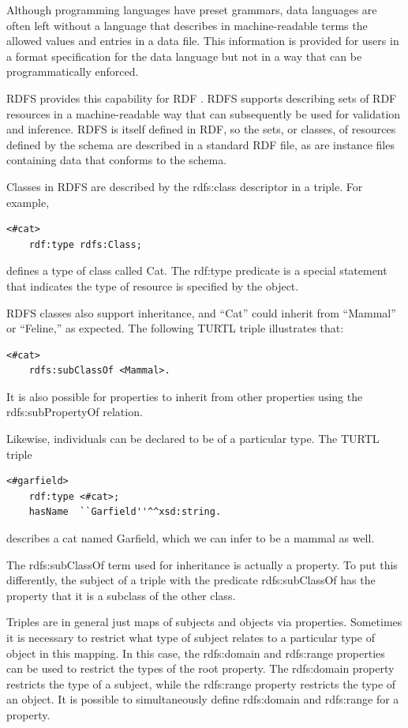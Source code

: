 Although programming languages have preset grammars, data languages are often
left without a language that describes in machine-readable terms the allowed
values and entries in a data file. This information is provided for users in
a format specification for the data language but not in a way that can be
programmatically enforced. 

RDFS provides this capability for RDF \cite{noauthor_rdf_nodate-5}\cite{
allemang_semantic_2008}. RDFS supports describing sets of RDF resources in a
machine-readable way that can subsequently be used for validation and inference.
RDFS is itself defined in RDF, so the sets, or classes, of resources defined by
the schema are described in a standard RDF file, as are instance files
containing data that conforms to the schema.

Classes in RDFS are described by the rdfs:class descriptor in a triple. For
example,
\begin{lstlisting}[language=TURTL]
<#cat>
    rdf:type rdfs:Class;
\end{lstlisting}
defines a type of class called Cat. The rdf:type predicate is a special
statement that indicates the type of resource is specified by the
object. 

RDFS classes also support inheritance, and ``Cat'' could inherit from
``Mammal'' or ``Feline,'' as expected. The following TURTL triple illustrates
that:
\begin{lstlisting}[language=TURTL]
<#cat>
    rdfs:subClassOf <Mammal>.
\end{lstlisting}
It is also possible for properties to inherit from other properties using the
rdfs:subPropertyOf relation.

Likewise, individuals can be declared to be of a particular type. The TURTL
triple
\begin{lstlisting}[language=TURTL]
<#garfield>
    rdf:type <#cat>;
    hasName  ``Garfield''^^xsd:string.
\end{lstlisting}
describes a cat named Garfield, which we can infer to be a mammal as well.

The rdfs:subClassOf term used for inheritance is actually a property. To put
this differently, the subject of a triple with the predicate rdfs:subClassOf
has the property that it is a subclass of the other class. 

Triples are in general just maps of subjects and objects via properties.
Sometimes it is necessary to restrict what type of subject relates to a
particular type of object in this mapping. In this case, the rdfs:domain and
rdfs:range properties can be used to restrict the types of the root property.
The rdfs:domain property restricts the type of a subject, while the rdfs:range
property restricts the type of an object. It is possible to simultaneously
define rdfs:domain and rdfs:range for a property.

